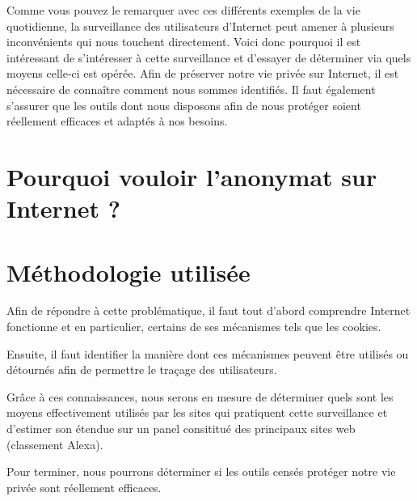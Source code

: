 Comme vous pouvez le remarquer avec ces différents exemples de la vie quotidienne, la surveillance des utilisateurs d'Internet peut amener à plusieurs inconvénients qui nous touchent directement. Voici donc pourquoi il est intéressant de s'intéresser à cette surveillance et d'essayer de déterminer via quels moyens celle-ci est opérée. Afin de préserver notre vie privée sur Internet, il est nécessaire de connaître comment nous sommes identifiés. Il faut également s'assurer que les outils dont nous disposons afin de nous protéger soient réellement efficaces et adaptés à nos besoins.

\section{Pourquoi vouloir l'anonymat sur Internet ?}

\section{Méthodologie utilisée}
Afin de répondre à cette problématique, il faut tout d'abord comprendre Internet fonctionne et en particulier, certains de ses mécanismes tels que les cookies.

Ensuite, il faut identifier la manière dont ces mécanismes peuvent être utilisés ou détournés afin de permettre le traçage des utilisateurs.

Grâce à ces connaissances, nous serons en mesure de déterminer quels sont les moyens effectivement utilisés par les sites qui pratiquent cette surveillance et d'estimer son étendue sur un panel consititué des principaux sites web (classement Alexa\cite{AlexaTop}).

Pour terminer, nous pourrons déterminer si les outils censés protéger notre vie privée sont réellement efficaces. %
